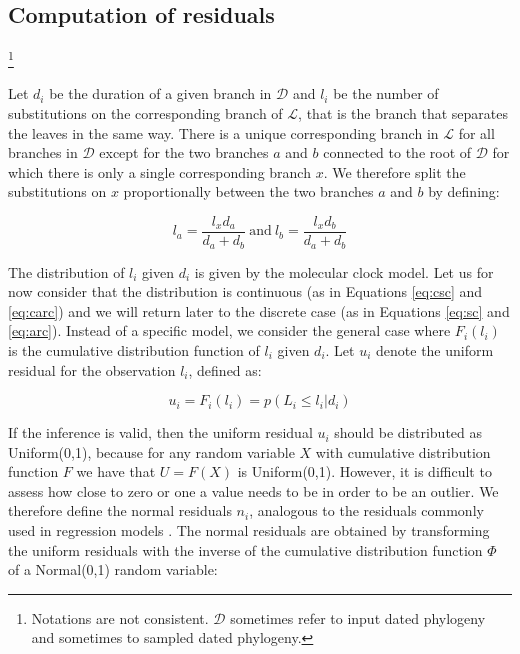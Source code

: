 \documentclass{article}
\begin{document}
\subsection*{Computation of residuals}

\footnote{Notations are not consistent. $\mathcal{D}$ sometimes refer to input dated phylogeny and sometimes to sampled dated phylogeny.}

Let $d_i$ be the duration of a given branch in $\mathcal{D}$ and $l_i$ be the number of substitutions on the corresponding branch of $\mathcal{L}$, that is the branch that separates the leaves in the same way. There is a unique corresponding branch in $\mathcal{L}$ for all branches in $\mathcal{D}$ except for the two branches $a$ and $b$ connected to the root of $\mathcal{D}$ for which there is only a single corresponding branch $x$. We therefore split the substitutions on $x$ proportionally between the two branches $a$ and $b$ by defining:

\begin{equation}
l_a = \frac{l_x d_a}{d_a+d_b}\mathrm{~and~}l_b = \frac{l_x d_b}{d_a+d_b}
\end{equation}

The distribution of $l_i$ given $d_i$ is given by the molecular clock model. 
Let us for now consider that the distribution
is continuous (as in Equations \ref{eq:csc} and \ref{eq:carc}) and we will return later to the discrete case 
(as in Equations \ref{eq:sc} and \ref{eq:arc}). 
Instead of a specific model, we consider the general case where
$F_i(l_i)$ is the cumulative distribution function of $l_i$ given $d_i$.
Let $u_i$ denote the uniform residual for the observation $l_i$, defined as:

\begin{equation}
u_i=F_i(l_i)=p(L_i\leq l_i|d_i)
\label{eq:unif-resid}
\end{equation}

If the inference is valid, then the uniform residual $u_i$ 
should be distributed as Uniform(0,1), because for any random variable $X$ with cumulative distribution function $F$ we have that $U=F(X)$ is Uniform(0,1). 
However, it is difficult to assess how close to zero or one a value needs to be in order to be 
an outlier. 
We therefore define the normal residuals $n_i$, analogous to the residuals commonly used in 
regression models \citep{coxGeneralDefinitionResiduals1968,dunnRandomizedQuantileResiduals1996}. 
The normal residuals are obtained 
by transforming the uniform residuals with the inverse of the cumulative distribution function $\Phi$ 
of a Normal(0,1) random variable:
\end{document}
